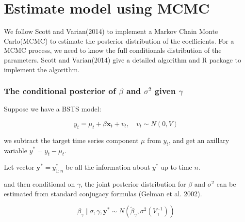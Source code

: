 \section{Estimate model using MCMC}
 





We follow Scott and Varian(2014) \cite{Scott2014}  to implement a Markov Chain Monte Carlo(MCMC) to estimate the posterior distribution of the coefficients. For a MCMC process, we need to know the full conditionals distribution of the parameters. Scott and Varian(2014) give a detailed algorithm and R package to implement the algorithm. 



\subsubsection{The conditional posterior of $\beta$ and $\sigma^2$ given $\gamma$}






Suppose we have a BSTS model:  







$$y_t = \mu_t + \beta \mathbf{x}_t + v_{t}, \quad v_{t} \sim N(0, V)$$  











we subtract the target time series component $\mu$ from $y_t$, and get an axillary variable $y^* = y_t - \mu_t$.   







Let vector $\mathbf{y}^* = y_{1:n}^*$ be all the information about $y^*$ up to time $n$.   

and then conditional on $\gamma$, the joint posterior distribution for $\beta$ and $\sigma^2$ can be estimated from standard conjugacy formulas (Gelman et al. 2002).   







$$\beta_{\gamma} \mid \sigma, \gamma, \mathbf{y}^*  \sim  N(\tilde \beta_{\gamma}, \sigma^2(V_{\gamma}^{-1}))$$  
















